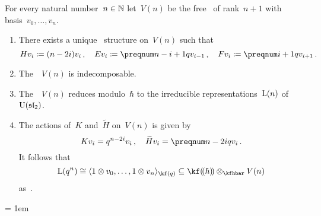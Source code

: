 \documentclass[a4paper, 11pt, oneside]{scrartcl}
\begin{document}
\begin{theorem}
  For every natural number~$n \in \mathbb{N}$ let~$V(n)$ be the free~\module{$\kfhbar$} of rank~$n+1$ with basis~$v_0, \dotsc, v_n$.
  \begin{enumerate}
    \item
      There exists a unique~ structure on~$V(n)$ such that
      \[
        H v_i \defined (n - 2i) v_i \,,
        \quad
        E v_i \defined \qnum{n - i + 1} v_{i-1} \,,
        \quad
        F v_i \defined \qnum{i+1} v_{i+1} \,.
      \]
    \item
      The~~$V(n)$ is indecomposable.
    \item
      The~~$V(n)$ reduces modulo~$\hbar$ to the irreducible representations~$\operatorname{L}(n)$ of~$\operatorname{U}(\mathfrak{sl}_2)$.
    \item
      The actions of~$K$ and~$\widetilde{H}$ on~$V(n)$ is given by
      \[
        K v_i
        =
        q^{n - 2i} v_i \,,
        \quad
        \widetilde{H} v_i
        =
        \qnum{n - 2i} v_i \,.
      \]
      It follows that
      \[
        \irred(q^n)
        \cong
        \gen{1 \tensor v_0, \dotsc, 1 \tensor v_n}_{\kf(q)}
        \subseteq
        \lpower{\kf}{\hbar} \tensor_{\kfhbar} V(n)
      \]
      as~.
  \end{enumerate}
\end{theorem}





\emergencystretch = 1em
\printbibliography
\end{document}
